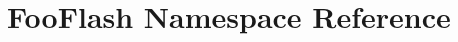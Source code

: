 \hypertarget{namespaceFooFlash}{\section{Foo\-Flash Namespace Reference}
\label{namespaceFooFlash}
}
